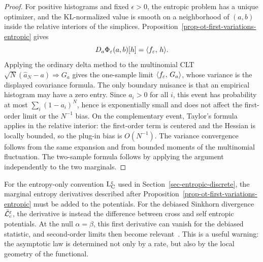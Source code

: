 \begin{proof}
	For positive histograms and fixed \(\epsilon>0\), the entropic problem has a unique optimizer, and the KL-normalized value is smooth on a neighborhood of \((a,b)\) inside the relative interiors of the simplices.  Proposition~\ref{prop-ot-first-variations-entropic} gives
	\[
		D_a\Phi_\varepsilon(a,b)[h]=\langle f_\varepsilon,\,h\rangle.
	\]
	Applying the ordinary delta method to the multinomial CLT
	\(\sqrt N(\hat a_N-a)\Rightarrow G_a\) gives the one-sample limit
	\(\langle f_\varepsilon,\,G_a\rangle\), whose variance is the displayed covariance formula.  The only boundary nuisance is that an empirical histogram may have a zero entry.  Since \(a_i>0\) for all \(i\), this event has probability at most \(\sum_i(1-a_i)^N\), hence is exponentially small and does not affect the first-order limit or the \(N^{-1}\) bias.  On the complementary event, Taylor's formula applies in the relative interior: the first-order term is centered and the Hessian is locally bounded, so the plug-in bias is \(O(N^{-1})\).  The variance convergence follows from the same expansion and from bounded moments of the multinomial fluctuation.  The two-sample formula follows by applying the argument independently to the two marginals.
\end{proof}

For the entropy-only convention \(\mathrm{L}_{\mathrm{C}}^\varepsilon\) used in Section~\ref{sec-entropic-discrete}, the marginal entropy derivatives described after Proposition~\ref{prop-ot-first-variations-entropic} must be added to the potentials.  For the debiased Sinkhorn divergence \(\bar{\mathcal{L}}_c^\varepsilon\), the derivative is instead the difference between cross and self entropic potentials.  At the null \(\alpha=\beta\), this first derivative can vanish for the debiased statistic, and second-order limits then become relevant~\cite{goldfeld2022limit}.  This is a useful warning: the asymptotic law is determined not only by a rate, but also by the local geometry of the functional.

